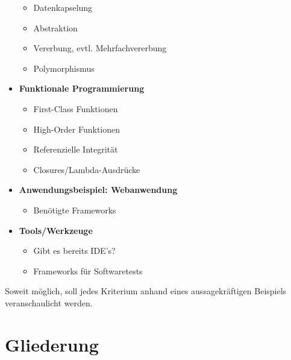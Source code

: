 \documentclass[
    paper=a4,
    bibtotocnumbered,
    liststotocnumbered,
    oneside,
    12pt,
    listof=totoc,
    toc=chapterentrywithdots,
    listof=entryprefix,
]{scrartcl}
\begin{document}
\begin{itemize}
\begin{itemize}
        \item Datenkapselung
        \item Abstraktion
        \item Vererbung, evtl. Mehrfachvererbung
        \item Polymorphismus
    \end{itemize}
    \item \textbf{Funktionale Programmierung}
    \begin{itemize}
      \item First-Class Funktionen
      \item High-Order Funktionen
      \item Referenzielle Integrität
      \item Closures/Lambda-Ausdrücke
    \end{itemize}
  \item \textbf{Anwendungsbeispiel: Webanwendung}
  \begin{itemize}
    \item Benötigte Frameworks
  \end{itemize}
  \item \textbf{Tools/Werkzeuge}
  \begin{itemize}
    \item Gibt es bereits IDE's?
    \item Frameworks für Softwaretests
  \end{itemize}
\end{itemize}

Soweit möglich, soll jedes Kriterium anhand eines aussagekräftigen Beispiels veranschaulicht werden. 

\section{Gliederung}
\end{document}
